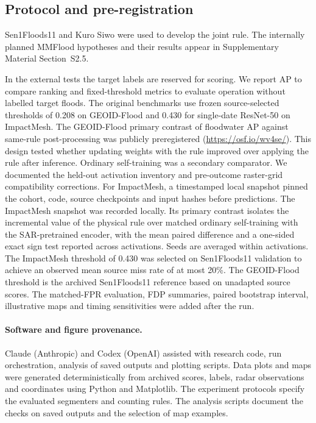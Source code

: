 \documentclass[a4paper,fleqn]{cas-sc}
\begin{document}
\subsection{Protocol and pre-registration}
Sen1Floods11 and Kuro Siwo were used to develop the joint rule. The internally planned MMFlood hypotheses and their results appear in Supplementary Material Section~S2.5.

In the external tests the target labels are reserved for scoring. We report AP to compare ranking and fixed-threshold metrics to evaluate operation without labelled target floods. The original benchmarks use frozen source-selected thresholds of 0.208 on GEOID-Flood and 0.430 for single-date ResNet-50 on ImpactMesh. The GEOID-Flood primary contrast of floodwater AP against same-rule post-processing was publicly preregistered (\url{https://osf.io/wv4se/}). This design tested whether updating weights with the rule improved over applying the rule after inference. Ordinary self-training was a secondary comparator. We documented the held-out activation inventory and pre-outcome raster-grid compatibility corrections. For ImpactMesh, a timestamped local snapshot pinned the cohort, code, source checkpoints and input hashes before predictions. The ImpactMesh snapshot was recorded locally. Its primary contrast isolates the incremental value of the physical rule over matched ordinary self-training with the SAR-pretrained encoder, with the mean paired difference and a one-sided exact sign test reported across activations. Seeds are averaged within activations. The ImpactMesh threshold of 0.430 was selected on Sen1Floods11 validation to achieve an observed mean source miss rate of at most 20\%. The GEOID-Flood threshold is the archived Sen1Floods11 reference based on unadapted source scores. The matched-FPR evaluation, FDP summaries, paired bootstrap interval, illustrative maps and timing sensitivities were added after the run.

\paragraph{Software and figure provenance.} Claude (Anthropic) and Codex (OpenAI) assisted with research code, run orchestration, analysis of saved outputs and plotting scripts. Data plots and maps were generated deterministically from archived scores, labels, radar observations and coordinates using Python and Matplotlib. The experiment protocols specify the evaluated segmenters and counting rules. The analysis scripts document the checks on saved outputs and the selection of map examples.
\end{document}
